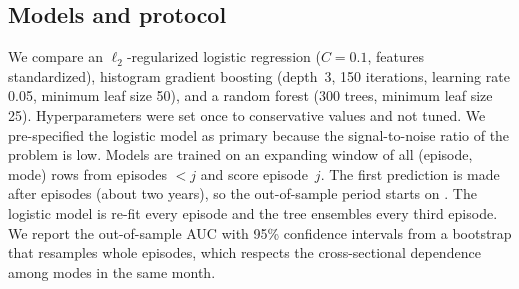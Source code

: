 \subsection{Models and protocol}

We compare an $\ell_2$-regularized logistic regression ($C=0.1$, features
standardized), histogram gradient boosting (depth~3, 150 iterations,
learning rate 0.05, minimum leaf size 50), and a random forest (300
trees, minimum leaf size 25). Hyperparameters were set once to
conservative values and not tuned. We pre-specified the logistic model
as primary because the signal-to-noise ratio of the problem is low.
Models are trained on an expanding window of all (episode, mode) rows
from episodes $<j$ and score episode~$j$. The first prediction is made
after \MinTrain{} episodes (about two years), so the out-of-sample
period starts on \OOSStart{}. The logistic model is re-fit every
episode and the tree ensembles every third episode. We report the
out-of-sample AUC with 95\% confidence intervals from a bootstrap that
resamples whole episodes, which respects the cross-sectional
dependence among modes in the same month.

